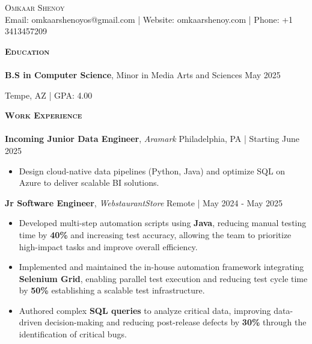 \documentclass[10pt]{article}
\newcommand{\lineunder} {
    \vspace*{-8pt} \\
    \hspace*{-18pt} \hrulefill \\
}
\newcommand{\header} [1] {
    {\hspace*{-15pt}\vspace*{3pt} \textsc{#1}}
    \vspace*{-2pt} \lineunder
}
\begin{document}
\begin{center}
  {\Huge \scshape {Omkaar Shenoy}}\\
  \vspace{1mm}
  Email: omkaarshenoyos@gmail.com |  Website: omkaarshenoy.com | Phone: +1 3413457209
\end{center}

\header{\textbf{Education}}
\vspace{0.5mm}
\textbf{B.S in Computer Science}, Minor in Media Arts and Sciences   \hfill May 2025

 \hfill Tempe, AZ | {GPA: 4.00}
\\
\vspace{2mm}

\header{\textbf{Work Experience}}

\vspace{0.5mm}
\textbf{Incoming Junior Data Engineer}, \textit{Aramark} \hfill Philadelphia, PA | Starting June 2025
\vspace{-1mm}
\begin{itemize}[leftmargin=5mm, itemsep=0mm]
  \item Design cloud-native data pipelines (Python, Java) and optimize SQL on Azure to deliver scalable BI solutions.
\end{itemize}




\textbf{Jr Software Engineer}, \textit{WebstaurantStore} \hfill Remote | May 2024 - May 2025\\
\vspace{-1mm}
\begin{itemize}[leftmargin=5mm, itemsep=0mm]
  
    \item Developed multi-step automation scripts using \textbf{Java}, reducing manual testing time by \textbf{40\%} and increasing test accuracy, allowing the team to prioritize high-impact tasks and improve overall efficiency.
    \item Implemented and maintained the in-house automation framework integrating \textbf{Selenium Grid}, enabling parallel test execution and reducing test cycle time by \textbf{50\%} establishing a scalable test infrastructure.
    \item Authored complex \textbf{SQL queries} to analyze critical data, improving data-driven decision-making and reducing post-release defects by \textbf{30\%} through the identification of critical bugs.
\end{itemize}
\end{document}
